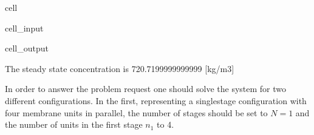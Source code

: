\documentclass[letterpaper,10pt,english]{jupyterBook}
\begin{document}
\begin{sphinxuseclass}{cell}
\begin{sphinxVerbatimInput}
\begin{sphinxuseclass}{cell_input}
\begin{sphinxVerbatim}[commandchars=\\\{\}]
\PYG{p}{[}\PYG{p}{]}\PYG{p}{[}\PYG{p}{]}\PYG{p}{[}\PYG{p}{]}

   
\end{sphinxVerbatim}

\end{sphinxuseclass}\end{sphinxVerbatimInput}
\begin{sphinxVerbatimOutput}

\begin{sphinxuseclass}{cell_output}
\begin{sphinxVerbatim}[commandchars=\\\{\}]
The steady state concentration is 720.7199999999999 [kg/m\PYGZca{}3]
\end{sphinxVerbatim}

\end{sphinxuseclass}\end{sphinxVerbatimOutput}

\end{sphinxuseclass}
\sphinxAtStartPar
In order to answer the problem request one should solve the system for two different configurations.
In the first, representing a single\sphinxhyphen{}stage configuration with four membrane units in parallel, the number of stages should be set to \(N=1\) and the number of units in the first stage \(n_1\) to 4.
\end{document}
